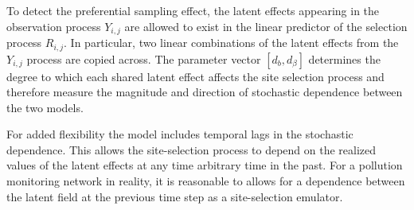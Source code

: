 To detect the preferential sampling effect, the latent effects appearing in the observation process 
$Y_{i, j}$ are allowed to exist
in the linear predictor of the selection process $R_{i, j}$. In particular, two linear 
combinations of the latent effects from the $Y_{i, j}$ process are copied across. The parameter 
vector $[d_b, d_{\beta}]$ determines the degree to which each shared latent effect affects the site 
selection process and therefore measure the magnitude and direction of stochastic
dependence between the two models. 

For added flexibility the model includes temporal lags in the stochastic dependence. This allows 
the site-selection process to depend on the realized values of the latent effects at any time arbitrary 
time in the past. For a pollution monitoring network in reality, it is reasonable to 
allows for a dependence between the latent field at the previous time step 
as a site-selection emulator.
